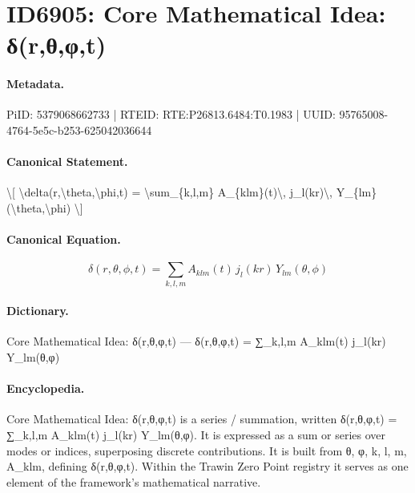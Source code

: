 \section*{ID6905: Core Mathematical Idea: δ(r,θ,φ,t)}
\paragraph{Metadata.}
PiID: 5379068662733 | RTEID: RTE:P26813.6484:T0.1983 | UUID: 95765008-4764-5e5c-b253-625042036644

\paragraph{Canonical Statement.}
\textbackslash{}[ \textbackslash{}delta(r,\textbackslash{}theta,\textbackslash{}phi,t) = \textbackslash{}sum\_\{k,l,m\} A\_\{klm\}(t)\textbackslash{}, j\_l(kr)\textbackslash{}, Y\_\{lm\}(\textbackslash{}theta,\textbackslash{}phi) \textbackslash{}]

\paragraph{Canonical Equation.}
\[
\delta(r,\theta,\phi,t) = \sum_{k,l,m} A_{klm}(t)\, j_l(kr)\, Y_{lm}(\theta,\phi)
\]

\paragraph{Dictionary.}
Core Mathematical Idea: δ(r,θ,φ,t) — δ(r,θ,φ,t) = ∑\_k,l,m A\_klm(t) j\_l(kr) Y\_lm(θ,φ)

\paragraph{Encyclopedia.}
Core Mathematical Idea: δ(r,θ,φ,t) is a series / summation, written δ(r,θ,φ,t) = ∑\_k,l,m A\_klm(t) j\_l(kr) Y\_lm(θ,φ). It is expressed as a sum or series over modes or indices, superposing discrete contributions. It is built from θ, φ, k, l, m, A\_klm, defining δ(r,θ,φ,t). Within the Trawin Zero Point registry it serves as one element of the framework's mathematical narrative.
